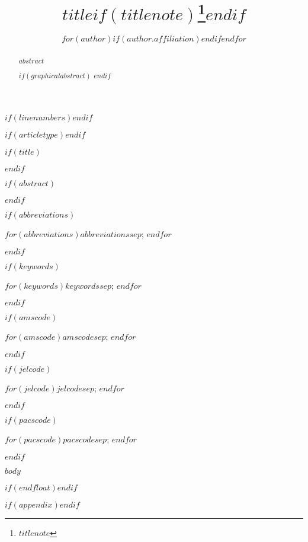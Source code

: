 \documentclass[]{interact}
\theoremstyle{plain}
\theoremstyle{definition}
\theoremstyle{remark}
\begin{document}
$if(linenumbers)$\linenumbers$endif$

$if(articletype)$$endif$

$if(title)$
\title{$title$$if(titlenote)$\thanks{$titlenote$}$endif$}
$endif$

\author{%
$for(author)$$if(author.affiliation)$$endif$$endfor$
}

\maketitle

$if(abstract)$
\begin{abstract}
$abstract$

$if(graphicalabstract)$
$endif$
\end{abstract}
$endif$

$if(abbreviations)$
\begin{abbreviations}
$for(abbreviations)$$abbreviations$$sep$; $endfor$
\end{abbreviations}
$endif$

$if(keywords)$
\begin{keywords}
$for(keywords)$$keywords$$sep$; $endfor$
\end{keywords}
$endif$

$if(amscode)$
\begin{amscode}
$for(amscode)$$amscode$$sep$; $endfor$
\end{amscode}
$endif$

$if(jelcode)$
\begin{jelcode}
$for(jelcode)$$jelcode$$sep$; $endfor$
\end{jelcode}
$endif$

$if(pacscode)$
\begin{pacscode}
$for(pacscode)$$pacscode$$sep$; $endfor$
\end{pacscode}
$endif$

$body$

$if(endfloat)$\processdelayedfloats$endif$

$if(appendix)$\appendix$endif$
\end{document}
